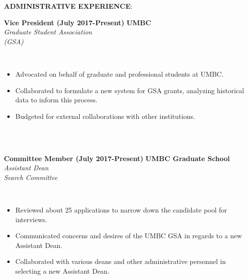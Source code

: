 \documentclass{article}
\begin{document}
\noindent \textbf{ADMINISTRATIVE EXPERIENCE}:\\
\begin{vwcol}[widths={0.8,0.2}, sep=.8cm, justify=flush, rule=0pt, indent=0em]
\noindent \textbf{Vice President (July 2017-Present)}
\newpage
\noindent \textbf{UMBC}\\
\noindent \emph{Graduate Student Association}\\
\noindent \emph{(GSA)}
\end{vwcol}
\phantom \\
\begin{itemize}
\item Advocated on behalf of graduate and professional students at UMBC.
\item Collaborated to formulate a new system for GSA grants, analyzing historical data to inform this process.
\item Budgeted for external collaborations with other institutions.
\end{itemize}
\phantom \\
\phantom\\
%
%
%
%
\begin{vwcol}[widths={0.8,0.2}, sep=.8cm, justify=flush, rule=0pt, indent=0em]
\noindent \textbf{Committee Member (July 2017-Present)}
\newpage
\noindent \textbf{UMBC Graduate School}\\
\noindent \emph{Assistant Dean}\\
\noindent \emph{Search Committee}
\end{vwcol}
\phantom \\
\begin{itemize}
\item Reviewed about 25 applications to narrow down the candidate pool for interviews.
\item Communicated concerns and desires of the UMBC GSA in regards to a new Assistant Dean.
\item Collaborated with various deans and other administrative personnel in selecting a new Assistant Dean.
\end{itemize}
\phantom \\
\phantom\\
\end{document}
